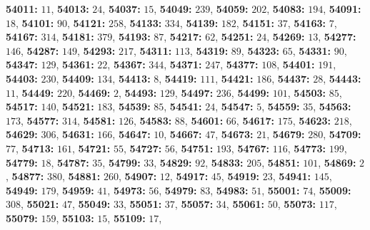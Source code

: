 \textsf{\bfseries 54011:} $11$, \textsf{\bfseries 54013:} $24$, \textsf{\bfseries 54037:} $15$, \textsf{\bfseries 54049:} $239$, \textsf{\bfseries 54059:} $202$, \textsf{\bfseries 54083:} $194$, \textsf{\bfseries 54091:} $18$, \textsf{\bfseries 54101:} $90$, \textsf{\bfseries 54121:} $258$, \textsf{\bfseries 54133:} $334$, \textsf{\bfseries 54139:} $182$, \textsf{\bfseries 54151:} $37$, \textsf{\bfseries 54163:} $7$, \textsf{\bfseries 54167:} $314$, \textsf{\bfseries 54181:} $379$, \textsf{\bfseries 54193:} $87$, \textsf{\bfseries 54217:} $62$, \textsf{\bfseries 54251:} $24$, \textsf{\bfseries 54269:} $13$, \textsf{\bfseries 54277:} $146$, \textsf{\bfseries 54287:} $149$, \textsf{\bfseries 54293:} $217$, \textsf{\bfseries 54311:} $113$, \textsf{\bfseries 54319:} $89$, \textsf{\bfseries 54323:} $65$, \textsf{\bfseries 54331:} $90$, \textsf{\bfseries 54347:} $129$, \textsf{\bfseries 54361:} $22$, \textsf{\bfseries 54367:} $344$, \textsf{\bfseries 54371:} $247$, \textsf{\bfseries 54377:} $108$, \textsf{\bfseries 54401:} $191$, \textsf{\bfseries 54403:} $230$, \textsf{\bfseries 54409:} $134$, \textsf{\bfseries 54413:} $8$, \textsf{\bfseries 54419:} $111$, \textsf{\bfseries 54421:} $186$, \textsf{\bfseries 54437:} $28$, \textsf{\bfseries 54443:} $11$, \textsf{\bfseries 54449:} $220$, \textsf{\bfseries 54469:} $2$, \textsf{\bfseries 54493:} $129$, \textsf{\bfseries 54497:} $236$, \textsf{\bfseries 54499:} $101$, \textsf{\bfseries 54503:} $85$, \textsf{\bfseries 54517:} $140$, \textsf{\bfseries 54521:} $183$, \textsf{\bfseries 54539:} $85$, \textsf{\bfseries 54541:} $24$, \textsf{\bfseries 54547:} $5$, \textsf{\bfseries 54559:} $35$, \textsf{\bfseries 54563:} $173$, \textsf{\bfseries 54577:} $314$, \textsf{\bfseries 54581:} $126$, \textsf{\bfseries 54583:} $88$, \textsf{\bfseries 54601:} $66$, \textsf{\bfseries 54617:} $175$, \textsf{\bfseries 54623:} $218$, \textsf{\bfseries 54629:} $306$, \textsf{\bfseries 54631:} $166$, \textsf{\bfseries 54647:} $10$, \textsf{\bfseries 54667:} $47$, \textsf{\bfseries 54673:} $21$, \textsf{\bfseries 54679:} $280$, \textsf{\bfseries 54709:} $77$, \textsf{\bfseries 54713:} $161$, \textsf{\bfseries 54721:} $55$, \textsf{\bfseries 54727:} $56$, \textsf{\bfseries 54751:} $193$, \textsf{\bfseries 54767:} $116$, \textsf{\bfseries 54773:} $199$, \textsf{\bfseries 54779:} $18$, \textsf{\bfseries 54787:} $35$, \textsf{\bfseries 54799:} $33$, \textsf{\bfseries 54829:} $92$, \textsf{\bfseries 54833:} $205$, \textsf{\bfseries 54851:} $101$, \textsf{\bfseries 54869:} $2$, \textsf{\bfseries 54877:} $380$, \textsf{\bfseries 54881:} $260$, \textsf{\bfseries 54907:} $12$, \textsf{\bfseries 54917:} $45$, \textsf{\bfseries 54919:} $23$, \textsf{\bfseries 54941:} $145$, \textsf{\bfseries 54949:} $179$, \textsf{\bfseries 54959:} $41$, \textsf{\bfseries 54973:} $56$, \textsf{\bfseries 54979:} $83$, \textsf{\bfseries 54983:} $51$, \textsf{\bfseries 55001:} $74$, \textsf{\bfseries 55009:} $308$, \textsf{\bfseries 55021:} $47$, \textsf{\bfseries 55049:} $33$, \textsf{\bfseries 55051:} $37$, \textsf{\bfseries 55057:} $34$, \textsf{\bfseries 55061:} $50$, \textsf{\bfseries 55073:} $117$, \textsf{\bfseries 55079:} $159$, \textsf{\bfseries 55103:} $15$, \textsf{\bfseries 55109:} $17$, 

